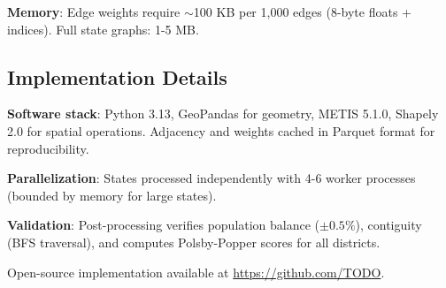 \textbf{Memory}: Edge weights require $\sim$100 KB per 1,000 edges (8-byte floats + indices). Full state graphs: 1-5 MB.

\subsection{Implementation Details}

\textbf{Software stack}: Python 3.13, GeoPandas for geometry, METIS 5.1.0, Shapely 2.0 for spatial operations. Adjacency and weights cached in Parquet format for reproducibility.

\textbf{Parallelization}: States processed independently with 4-6 worker processes (bounded by memory for large states).

\textbf{Validation}: Post-processing verifies population balance ($\pm 0.5\%$), contiguity (BFS traversal), and computes Polsby-Popper scores for all districts.

Open-source implementation available at \url{https://github.com/TODO}.
